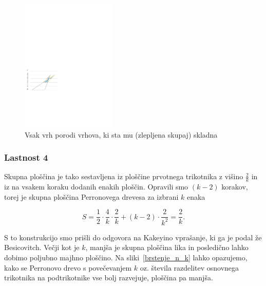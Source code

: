 \documentclass[a4paper, 12pt]{article}
\begin{document}
\begin{figure}[h!]
    \centering
    \includegraphics[width=0.4\textwidth]{ipe_slike/novi_vrhovi.pdf}
    \caption{Vsak vrh porodi vrhova, ki sta mu (zlepljena skupaj) skladna}
    \label{vrhovi}
\end{figure}


\subsubsection*{Lastnost 4}

Skupna ploščina je tako sestavljena iz ploščine prvotnega trikotnika z višino $ \frac{2}{k} $ in iz na vsakem koraku dodanih enakih ploščin. Opravili smo $ (k-2) $ korakov, torej je skupna ploščina Perronovega drevesa za izbrani $ k $ enaka

\begin{equation*}
    S = \frac{1}{2} \cdot \frac{4}{k} \cdot \frac{2}{k}  + (k -2) \cdot \frac{2}{k^2} = \frac{2}{k}.
\end{equation*}

S to konstrukcijo smo prišli do odgovora na Kakeyino vprašanje, ki ga je podal že Besicovitch. Večji kot je $ k $, manjša je skupna ploščina lika in posledično lahko dobimo poljubno majhno ploščino. Na sliki~\ref{brstenje_n_k} lahko opazujemo, kako se Perronovo drevo s povečevanjem $ k $ oz. števila razdelitev osnovnega trikotnika na podtrikotnike vse bolj razvejuje, ploščina pa manjša.
\end{document}
